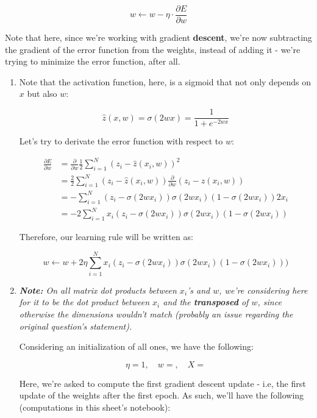 \documentclass[12pt]{article}
\begin{document}
\begin{enumerate}[leftmargin=\labelsep]
  $$
    w \leftarrow w - \eta \cdot \frac{\partial E}{\partial w}
  $$

  Note that here, since we're working with gradient \textbf{descent}, we're now
  subtracting the gradient of the error function from the weights, instead of
  adding it - we're trying to minimize the error function, after all.       

  \begin{enumerate}
    \item {
      Note that the activation function, here, is a sigmoid that not only depends
      on $x$ but also $w$:

      $$
        \hat{z}(x, w) = \sigma(2wx) =  \frac{1}{1 + e^{-2 w x}}
      $$

      Let's try to derivate the error function with respect to $w$:

      \begin{align*}
        \frac{\partial E}{\partial w} &= \frac{\partial}{\partial w} \frac{1}{2} \sum_{i=1}^N (z_i - \hat{z}(x_i, w))^2 \\
        &= \frac{2}{2} \sum_{i=1}^N (z_i - \hat{z}(x_i, w)) \frac{\partial}{\partial w} (z_i - \hat{z}(x_i, w)) \\
        &= - \sum_{i=1}^N (z_i - \sigma(2wx_i)) \sigma(2wx_i) (1 - \sigma(2wx_i)) 2x_i \\
        &= -2 \sum_{i=1}^N x_i (z_i - \sigma(2wx_i)) \sigma(2wx_i) (1 - \sigma(2wx_i))
      \end{align*}

      Therefore, our learning rule will be written as:

      $$
        w \leftarrow w + 2\eta \sum_{i=1}^N x_i (z_i - \sigma(2wx_i)) \sigma(2wx_i) (1 - \sigma(2wx_i)))
      $$
    }
    \item {
    
      \textit{\textbf{Note:} On all matrix dot products between $x_i$'s and $w$, we're
      considering here for it to be the dot product between $x_i$ and the \textbf{transposed}
      of $w$, since otherwise the dimensions wouldn't match (probably an issue regarding
      the original question's statement).}

      Considering an initialization of all ones, we have the following:

      $$
        \eta = 1, \quad w = , \quad X = 
      $$

      Here, we're asked to compute the first gradient descent update - i.e,
      the first update of the weights after the first epoch. As such, we'll have
      the following (computations in this sheet's notebook):

}
\end{enumerate}
\end{enumerate}
\end{document}
